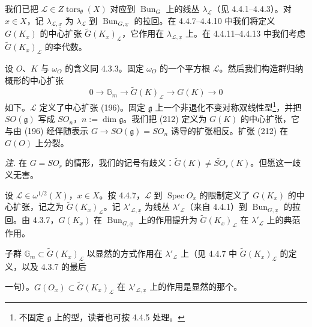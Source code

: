  我们已把 $\mathcal{L}\in Z\operatorname{tors}_{\theta}(X)$ 对应到 $\operatorname{Bun}_{G}$ 上的线丛 $\lambda_{\mathcal{L}}$（见 4.4.1–4.4.3）。对 $x\in X$，记 $\lambda_{\mathcal{L},\underline{x}}$ 为 $\lambda_{\mathcal{L}}$ 到 $\operatorname{Bun}_{G,\underline{x}}$ 的拉回。在 4.4.7–4.4.10 中我们将定义 $G(K_{x})$ 的中心扩张 $\tilde{G}(K_{x})_{\mathcal{L}}$，它作用在 $\lambda_{\mathcal{L},\underline{x}}$ 上。在 4.4.11–4.4.13 中我们考虑 $\tilde{G}(K_{x})_{\mathcal{L}}$ 的李代数。

 设 $O$、$K$ 与 $\omega_{O}$ 的含义同 4.3.3。固定 $\omega_{O}$ 的一个平方根 $\mathcal{L}$。然后我们构造群归纳概形的中心扩张
\begin{equation}\tag{212}
0\to\mathbb{G}_{m}\to\tilde{G}(K)_{\mathcal{L}}\to G(K)\to 0
\end{equation}
如下。$\mathcal{L}$ 定义了中心扩张 (196)。固定 $\mathfrak{g}$ 上一个非退化不变对称双线性型\footnote{不固定 $\mathfrak{g}$ 上的型，读者也可按 4.4.5 处理。}，并把 $SO(\mathfrak{g})$ 写成 $SO_{n}$，$n:=\dim\mathfrak{g}$。我们把 (212) 定义为 $G(K)$ 的中心扩张，它与由 (196) 经伴随表示 $G\to SO(\mathfrak{g})=SO_{n}$ 诱导的扩张相反。扩张 (212) 在 $G(O)$ 上分裂。

\emph{注.} 在 $G=SO_{r}$ 的情形，我们的记号有歧义：$\tilde{G}(K)\ne\tilde{SO}_{r}(K)$。但愿这一歧义无害。

 设 $\mathcal{L}\in\omega^{1/2}(X)$，$x\in X$。按 4.4.7，$\mathcal{L}$ 到 $\operatorname{Spec}O_{x}$ 的限制定义了 $G(K_{x})$ 的中心扩张，记之为 $\tilde{G}(K_{x})_{\mathcal{L}}$。记 $\lambda'_{\mathcal{L},\underline{x}}$ 为线丛 $\lambda'_{\mathcal{L}}$（来自 4.4.1）到 $\operatorname{Bun}_{G,\underline{x}}$ 的拉回。由 4.3.7，$G(K_{x})$ 在 $\operatorname{Bun}_{G,\underline{x}}$ 上的作用提升为 $\tilde{G}(K_{x})_{\mathcal{L}}$ 在 $\lambda'_{\mathcal{L}}$ 上的典范作用。

子群 $\mathbb{G}_{m}\subset\tilde{G}(K_{x})_{\mathcal{L}}$ 以显然的方式作用在 $\lambda'_{\mathcal{L}}$ 上（见 4.4.7 中 $\tilde{G}(K_{x})_{\mathcal{L}}$ 的定义，以及 4.3.7 的最后


一句）。$G(O_{x})\subset\tilde{G}(K_{x})_{\mathcal{L}}$ 在 $\lambda'_{\mathcal{L},\underline{x}}$ 上的作用是显然的那个。

